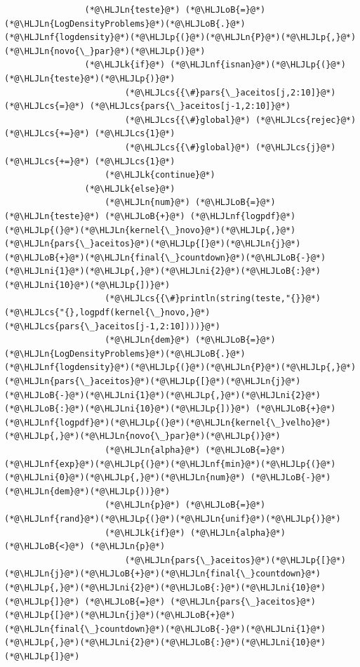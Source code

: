 \documentclass[12pt,a4paper]{article}
\newcommand{\HLJLk}[1]{\textcolor[RGB]{148,91,176}{\textbf{#1}}}
\newcommand{\HLJLn}[1]{#1}
\newcommand{\HLJLnf}[1]{\textcolor[RGB]{66,102,213}{#1}}
\newcommand{\HLJLni}[1]{\textcolor[RGB]{59,151,46}{#1}}
\newcommand{\HLJLoB}[1]{\textcolor[RGB]{102,102,102}{\textbf{#1}}}
\newcommand{\HLJLp}[1]{#1}
\newcommand{\HLJLcs}[1]{\textcolor[RGB]{153,153,119}{\textit{#1}}}
\begin{document}
\begin{lstlisting}
                (*@\HLJLn{teste}@*) (*@\HLJLoB{=}@*) (*@\HLJLn{LogDensityProblems}@*)(*@\HLJLoB{.}@*)(*@\HLJLnf{logdensity}@*)(*@\HLJLp{(}@*)(*@\HLJLn{P}@*)(*@\HLJLp{,}@*)(*@\HLJLn{novo{\_}par}@*)(*@\HLJLp{)}@*)
                (*@\HLJLk{if}@*) (*@\HLJLnf{isnan}@*)(*@\HLJLp{(}@*)(*@\HLJLn{teste}@*)(*@\HLJLp{)}@*)
                        (*@\HLJLcs{{\#}pars{\_}aceitos[j,2:10]}@*) (*@\HLJLcs{=}@*) (*@\HLJLcs{pars{\_}aceitos[j-1,2:10]}@*)
                        (*@\HLJLcs{{\#}global}@*) (*@\HLJLcs{rejec}@*) (*@\HLJLcs{+=}@*) (*@\HLJLcs{1}@*)
                        (*@\HLJLcs{{\#}global}@*) (*@\HLJLcs{j}@*) (*@\HLJLcs{+=}@*) (*@\HLJLcs{1}@*)
                    (*@\HLJLk{continue}@*)
                (*@\HLJLk{else}@*)
                    (*@\HLJLn{num}@*) (*@\HLJLoB{=}@*) (*@\HLJLn{teste}@*) (*@\HLJLoB{+}@*) (*@\HLJLnf{logpdf}@*)(*@\HLJLp{(}@*)(*@\HLJLn{kernel{\_}novo}@*)(*@\HLJLp{,}@*)(*@\HLJLn{pars{\_}aceitos}@*)(*@\HLJLp{[}@*)(*@\HLJLn{j}@*)(*@\HLJLoB{+}@*)(*@\HLJLn{final{\_}countdown}@*)(*@\HLJLoB{-}@*)(*@\HLJLni{1}@*)(*@\HLJLp{,}@*)(*@\HLJLni{2}@*)(*@\HLJLoB{:}@*)(*@\HLJLni{10}@*)(*@\HLJLp{])}@*)
                    (*@\HLJLcs{{\#}println(string(teste,"{}}@*) (*@\HLJLcs{"{},logpdf(kernel{\_}novo,}@*) (*@\HLJLcs{pars{\_}aceitos[j-1,2:10])))}@*)
                    (*@\HLJLn{dem}@*) (*@\HLJLoB{=}@*) (*@\HLJLn{LogDensityProblems}@*)(*@\HLJLoB{.}@*)(*@\HLJLnf{logdensity}@*)(*@\HLJLp{(}@*)(*@\HLJLn{P}@*)(*@\HLJLp{,}@*)(*@\HLJLn{pars{\_}aceitos}@*)(*@\HLJLp{[}@*)(*@\HLJLn{j}@*)(*@\HLJLoB{-}@*)(*@\HLJLni{1}@*)(*@\HLJLp{,}@*)(*@\HLJLni{2}@*)(*@\HLJLoB{:}@*)(*@\HLJLni{10}@*)(*@\HLJLp{])}@*) (*@\HLJLoB{+}@*) (*@\HLJLnf{logpdf}@*)(*@\HLJLp{(}@*)(*@\HLJLn{kernel{\_}velho}@*)(*@\HLJLp{,}@*)(*@\HLJLn{novo{\_}par}@*)(*@\HLJLp{)}@*)
                    (*@\HLJLn{alpha}@*) (*@\HLJLoB{=}@*) (*@\HLJLnf{exp}@*)(*@\HLJLp{(}@*)(*@\HLJLnf{min}@*)(*@\HLJLp{(}@*)(*@\HLJLni{0}@*)(*@\HLJLp{,}@*)(*@\HLJLn{num}@*) (*@\HLJLoB{-}@*) (*@\HLJLn{dem}@*)(*@\HLJLp{))}@*)
                    (*@\HLJLn{p}@*) (*@\HLJLoB{=}@*) (*@\HLJLnf{rand}@*)(*@\HLJLp{(}@*)(*@\HLJLn{unif}@*)(*@\HLJLp{)}@*)
                    (*@\HLJLk{if}@*) (*@\HLJLn{alpha}@*) (*@\HLJLoB{<}@*) (*@\HLJLn{p}@*)
                        (*@\HLJLn{pars{\_}aceitos}@*)(*@\HLJLp{[}@*)(*@\HLJLn{j}@*)(*@\HLJLoB{+}@*)(*@\HLJLn{final{\_}countdown}@*)(*@\HLJLp{,}@*)(*@\HLJLni{2}@*)(*@\HLJLoB{:}@*)(*@\HLJLni{10}@*)(*@\HLJLp{]}@*) (*@\HLJLoB{=}@*) (*@\HLJLn{pars{\_}aceitos}@*)(*@\HLJLp{[}@*)(*@\HLJLn{j}@*)(*@\HLJLoB{+}@*)(*@\HLJLn{final{\_}countdown}@*)(*@\HLJLoB{-}@*)(*@\HLJLni{1}@*)(*@\HLJLp{,}@*)(*@\HLJLni{2}@*)(*@\HLJLoB{:}@*)(*@\HLJLni{10}@*)(*@\HLJLp{]}@*)

\end{lstlisting}
\end{document}

